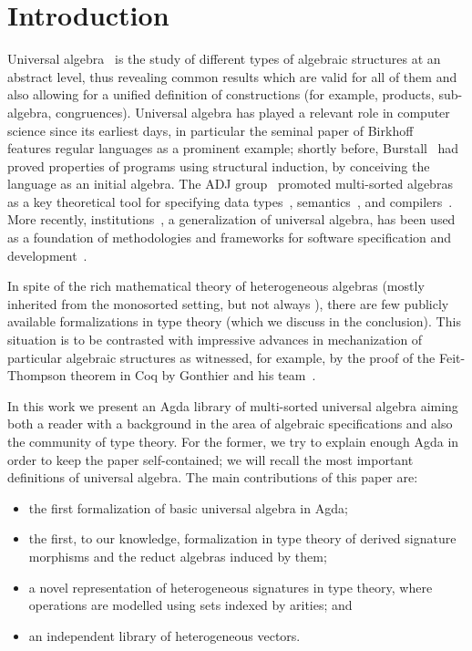 \section{Introduction}

Universal algebra~\cite{birkhoff-1935} is the study of different types
of algebraic structures at an abstract level, thus revealing common
results which are valid for all of them and also allowing for a
unified definition of constructions (for example, products,
sub-algebra, congruences). Universal algebra has played a relevant
role in computer science since its earliest days, in particular the
seminal paper of Birkhoff~\cite{birkhoff-70} features regular
languages as a prominent example; shortly before,
Burstall~\cite{burstall69} had proved properties of programs using
structural induction, by conceiving the language as an
initial algebra. The ADJ group~\cite{goguen-adj} promoted multi-sorted algebras as a
key theoretical tool for specifying data
types~\cite{adj-abstract-data-types}, semantics~\cite{goguen-77}, and
compilers~\cite{thatcher1981more}.  More recently,
institutions~\cite{goguen-92}, a generalization of universal algebra,
has been used as a foundation of methodologies and frameworks for
software specification and development~\cite{sannella2012foundations}.

In spite of the rich mathematical theory of heterogeneous algebras
(mostly inherited from the monosorted setting, but not always
\cite{tarlecki-nuances}), there are few publicly available
formalizations in type theory (which we discuss in the conclusion).
This situation is to be contrasted with impressive advances in
mechanization of particular algebraic structures as witnessed, for
example, by the proof of the Feit-Thompson theorem in Coq by Gonthier
and his team~\cite{gonthier2013machine}.

In this work we present an Agda library of multi-sorted universal
algebra aiming both a reader with a background in the area of
algebraic specifications and also the community of type theory.  For
the former, we try to explain enough Agda in order to keep the paper
self-contained; we will recall the most important definitions of
universal algebra. The main contributions of this paper are:
\begin{itemize}
\item the first formalization of basic universal algebra in Agda;
\item the first, to our knowledge, formalization in type theory of
  derived signature morphisms and the reduct algebras induced by them;
\item a novel representation of heterogeneous signatures in
  type theory, where operations are modelled using sets indexed by
  arities; and
\item an independent library of heterogeneous vectors.
\end{itemize}

